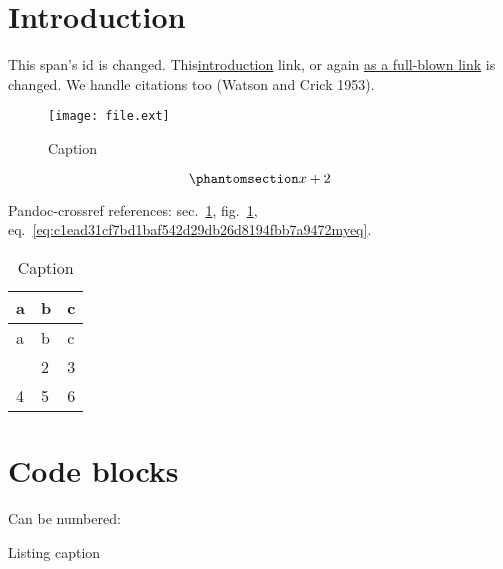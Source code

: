 \section{Introduction}\label{sec:c1ead31cf7bd1baf542d29db26d8194fbb7a9472intro}

\label{61879b5e0ffe4fbb0cb6788aa8462db5f9c333dbref}{This
span's id} is changed.
This\hyperref[sec:c1ead31cf7bd1baf542d29db26d8194fbb7a9472intro]{introduction}
link, or again \hyperref[introduction]{as a full-blown link} is changed.
We handle citations too (Watson and Crick 1953).

\begin{figure}
\centering
\texttt{[image: file.ext]}
\caption{Caption}\label{fig:image}
\end{figure}

\begin{equation}\phantomsection\label{eq:c1ead31cf7bd1baf542d29db26d8194fbb7a9472myeq}{x + 2}\end{equation}

Pandoc-crossref references:
sec.~\ref{sec:c1ead31cf7bd1baf542d29db26d8194fbb7a9472intro},
fig.~\ref{fig:image},
eq.~\ref{eq:c1ead31cf7bd1baf542d29db26d8194fbb7a9472myeq}.

\begin{longtable}[]{@{}lll@{}}
\caption{\label{tbl:c1ead31cf7bd1baf542d29db26d8194fbb7a9472label}Caption}\tabularnewline
\toprule\noalign{}
a & b & c \\
\midrule\noalign{}
\endfirsthead
\toprule\noalign{}
a & b & c \\
\midrule\noalign{}
\endhead
\bottomrule\noalign{}
\endlastfoot
1 & 2 & 3 \\
4 & 5 & 6 \\
\end{longtable}

\section{Code
blocks}\label{61879b5e0ffe4fbb0cb6788aa8462db5f9c333dbc1ead31cf7bd1baf542d29db26d8194fbb7a9472code-blocks}

Can be numbered:

\begin{codelisting}

\caption{Listing caption}\label{lst:c1ead31cf7bd1baf542d29db26d8194fbb7a9472numberedcode}

\begin{Shaded}
\begin{Highlighting}[]
 \NormalTok{ ()}
\OtherTok{=}  
\end{Highlighting}
\end{Shaded}

\end{codelisting}

